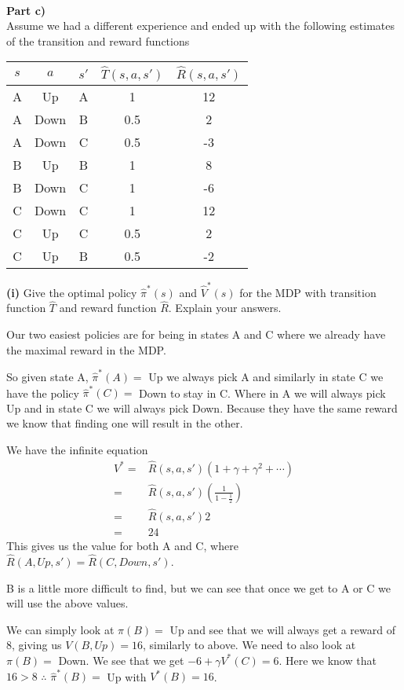 \documentclass[12pt,letter]{article}
\newcommand{\ppart}[1]{\vspace{2mm}\large\textbf{\\Part {#1})\vspace{2mm}}\normalsize\\}
\begin{document}
\ppart{c}
Assume we had a different experience and ended up with the following estimates
of the transition and reward functions
\begin{table}[ht]
\centering
\begin{tabular}{|c|c|c|c|c|}
    \hline
    $s$ & $a$ & $s'$ & $\hat{T}(s,a,s')$ & $\hat{R}(s,a,s')$\\\hline
    A & Up & A & 1 & 12\\\hline
    A & Down & B & 0.5 & 2\\\hline
    A & Down & C & 0.5 & -3\\\hline
    B & Up & B & 1 & 8\\\hline
    B & Down & C & 1 & -6\\\hline
    C & Down & C & 1 & 12\\\hline
    C & Up & C & 0.5 & 2 \\\hline
    C & Up & B & 0.5 & -2\\\hline
\end{tabular}
\end{table}

\textbf{(i)} Give the optimal policy $\hat\pi^*(s)$ and $\hat{V}^*(s)$ for the 
MDP with transition function $\hat{T}$ and reward function $\hat{R}$. Explain 
your answers.

Our two easiest policies are for being in states A and C where we already
have the maximal reward in the MDP.

So given state A, $\hat\pi^*(A)=$ Up we always pick A and similarly in state C we
have the policy $\hat\pi^*(C)=$ Down to stay in C. Where in A we will always pick
Up and in state C we will always pick Down. Because they have the same
reward we know that finding one will result in the other.

We have the infinite equation 
\begin{align*}
    V^*=&\hat{R}(s,a,s')(1 + \gamma + \gamma^2 + \cdots )\\
    =&\hat{R}(s,a,s')\left(\frac{1}{1-\frac12}\right)\\
    =&\hat{R}(s,a,s')2\\
    =&24
\end{align*}
This gives us the value for both A and C, where 
$\hat{R}(A,Up,s')=\hat{R}(C,Down,s')$.

B is a little more difficult to find, but we can see that once we get to A or
C we will use the above values.

We can simply look at $\pi(B)=$ Up and see that we will always get a reward
of 8, giving us $V(B,Up)=16$, similarly to above. We need to also look at 
$\pi(B)=$ Down. We see that we get $-6 + \gamma V^*(C) = 6$. Here we know
that $16>8$ $\therefore$ $\hat\pi^*(B) = $ Up with $V^*(B)=16$.
\end{document}
